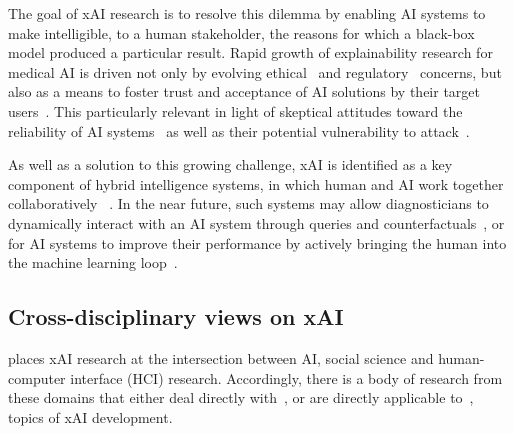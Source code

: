 \documentclass[final,5p,times,twocolumn,hyphens]{elsarticle}
\begin{document}

The goal of xAI research is to resolve this dilemma by enabling AI systems to make intelligible, to a human stakeholder, the reasons for which a black-box model produced a particular result.%
Rapid growth of explainability research for medical AI is driven not only by evolving ethical~\cite{MuellerEtAl:2021:TenCommandments} and regulatory~\cite{Schneeberger:2020:legalAI} concerns, but also as a means to foster trust and acceptance of AI solutions by their target users~\cite{GuidottiPedreschi:2019:Survey, ProsperiEtAl:2020:CausalHealth, Ferrario:trustmedicalai, gaube:trustmedicalai:2021, kastner2021relation}. This particularly relevant in light of skeptical attitudes toward the reliability of AI systems~\cite{quinn:trustmedicalai:2020, tosun_histomapr_2020} as well as their potential vulnerability to attack~\cite{finlayson2019adversarial, foote2021now}.

As well as a solution to this growing challenge, xAI is identified as a key component of hybrid intelligence systems, in which human and AI work together collaboratively ~\cite{hemmer2021human}. In the near future, such systems may allow diagnosticians to dynamically interact with an AI system through queries and counterfactuals~\cite{HolzingerEtAl:2021:GraphFusion, tosun_histomapr_2020}, or for AI systems to improve their performance by actively bringing the human into the machine learning loop~\cite{Holzinger:2020:explainable}.

\subsection{Cross-disciplinary views on xAI}

\citet{miller2019explanation} places xAI research at the intersection between AI, social science and human-computer interface (HCI) research. Accordingly, there is a body of research from these domains that either deal directly with~\cite{abdul2020cogam, holzinger2013human}, or are directly applicable to~\cite{nielsen2005ten}, topics of xAI development.
\end{document}

